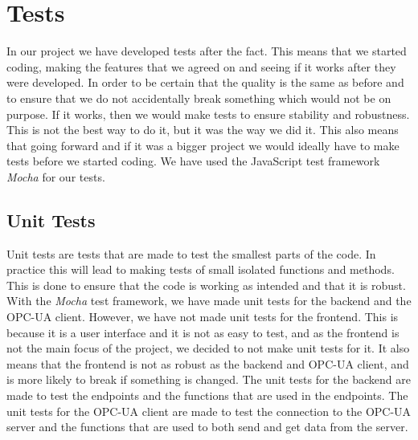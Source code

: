 \section{Tests}

In our project we have developed tests after the fact.
This means that we started coding, making the features that we agreed on
and seeing if it works after they were developed.
In order to be certain that the quality is the same as before
and to ensure that we do not accidentally break something which would not be on purpose.
If it works, then we would make tests to ensure stability and robustness.
This is not the best way to do it, but it was the way we did it.
This also means that going forward and if it was a bigger project
we would ideally have to make tests before we started coding.
We have used the JavaScript test framework \textit{Mocha} for our tests.

\subsection{Unit Tests}

Unit tests are tests that are made to test the smallest parts of the code.
In practice this will lead to making tests of small isolated functions and methods.
This is done to ensure that the code is working as intended and that it is robust.
With the \textit{Mocha} test framework, we have made unit tests for the backend and the OPC-UA client.
However, we have not made unit tests for the frontend.
This is because it is a user interface and it is not as easy to test, and as the frontend is not the main focus of the project, we decided to not make unit tests for it.
It also means that the frontend is not as robust as the backend and OPC-UA client, and is more likely to break if something is changed.
The unit tests for the backend are made to test the endpoints and the functions that are used in the endpoints.
The unit tests for the OPC-UA client are made to test the connection to the OPC-UA server and the functions that are used to both send and get data from the server. \newline

